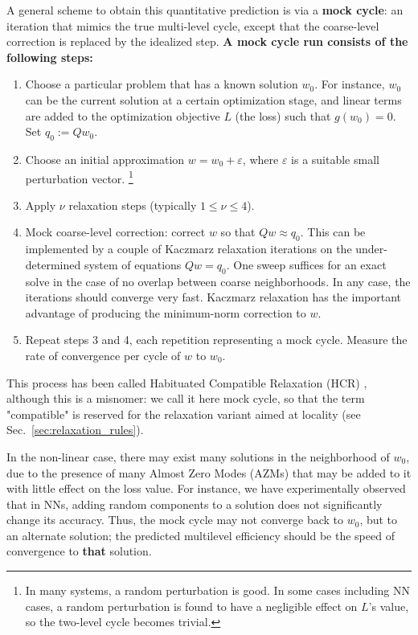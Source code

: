 \documentclass{article} %
\begin{document}
A general scheme to obtain this quantitative prediction is via a \textbf{mock cycle}: an iteration that mimics the true multi-level cycle, except that the coarse-level correction is replaced by the idealized step. {\bf A mock cycle run consists of the following steps:}
\begin{enumerate}
	\item Choose a particular problem that has a known solution $w_0$. For instance, $w_0$ can be the current solution at a certain optimization stage, and linear terms are added to the optimization objective $L$ (the loss) such that $g(w_0)=0$. Set $q_0 := Q w_0$.
	\item Choose an initial approximation $w = w_0 + \varepsilon$, where $\varepsilon$ is a suitable small perturbation vector. \footnote{In many systems, a random perturbation is good. In some cases including NN cases, a random perturbation is found to have a negligible effect on $L$'s value, so the two-level cycle becomes trivial.}
	\item Apply $\nu$ relaxation steps (typically $1 \leq \nu \leq 4$).
	\item Mock coarse-level correction: correct $w$ so that $Q w \approx q_0$. This can be implemented by a couple of Kaczmarz relaxation iterations \cite[Sec.~1.1]{guide} on the under-determined system of equations $Q w = q_0$. One sweep suffices for an exact solve in the case of no overlap between coarse neighborhoods. In any case, the iterations should converge very fast. Kaczmarz relaxation has the important advantage of producing the minimum-norm correction to $w$.
	\item Repeat steps 3 and 4, each repetition representing a mock cycle. Measure the rate of convergence per cycle of $w$ to $w_0$.
\end{enumerate}
This process has been called Habituated Compatible Relaxation (HCR) \cite[Sec.~14.3]{guide}, although this is a misnomer: we call it here mock cycle, so that the term "compatible" is reserved for the relaxation variant aimed at locality (see Sec.~\ref{sec:relaxation_rules}).

In the non-linear case, there may exist many solutions in the neighborhood of $w_0$, due to the presence of many Almost Zero Modes (AZMs) that may be added to it with little effect on the loss value. For instance, we have experimentally observed that in NNs, adding random components to a solution does not significantly change its accuracy. Thus, the mock cycle may not converge back to $w_0$, but to an alternate solution; the predicted multilevel efficiency should be the speed of convergence to \textbf{that} solution.
\end{document}
